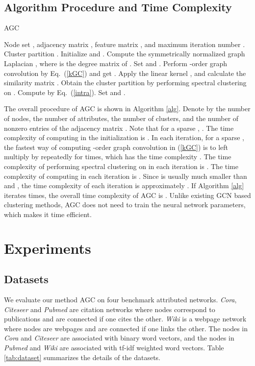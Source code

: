 \documentclass{article}
\begin{document}
\subsection{Algorithm Procedure and Time Complexity}



\begin{algorithm}[t]\footnotesize
\caption{AGC}
\label{alg}
\begin{algorithmic}[1]
\REQUIRE
Node set , adjacency matrix , feature matrix , and maximum iteration number .
\ENSURE
Cluster partition .
\STATE Initialize  and . Compute the symmetrically normalized graph Laplacian , where  is the degree matrix of .
\REPEAT
\STATE Set  and .
\STATE Perform -order graph convolution by Eq.~(\ref{kGC}) and get .
\STATE Apply the linear kernel , and calculate the similarity matrix .
\STATE Obtain the cluster partition  by performing spectral clustering on .
\STATE Compute  by Eq.~(\ref{intra}).
\STATE Set  and .
\end{algorithmic}
\end{algorithm}

The overall procedure of AGC is shown in Algorithm \ref{alg}.
Denote by  the number of nodes,  the number of attributes,  the number of clusters, and  the number of nonzero entries of the adjacency matrix . Note that for a sparse , . The time complexity of computing  in the initialization is . In each iteration, for a sparse , the fastest way of computing -order graph convolution in (\ref{kGC}) is to left multiply  by  repeatedly for  times, which has the time complexity . The time complexity of performing spectral clustering on  in each iteration is . The time complexity of computing  in each iteration is . Since  is usually much smaller than  and , the time complexity of each iteration is approximately  . If Algorithm \ref{alg} iterates  times, the overall time complexity of AGC is . Unlike existing GCN based clustering methods, AGC does not need to train the neural network parameters, which makes it time efficient.


 
\section{Experiments}

\subsection{Datasets}
We evaluate our method AGC on four benchmark attributed networks. \emph{Cora}, \emph{Citeseer} and \emph{Pubmed} \cite{kipf2016variational} are citation networks where nodes correspond to publications and are connected if one cites the other. \emph{Wiki} \cite{yang2015network} is a webpage network where nodes are webpages and are connected if one links the other.
The nodes in \emph{Cora} and \emph{Citeseer} are associated with binary word vectors, and the nodes in \emph{Pubmed} and \emph{Wiki} are associated with tf-idf weighted word vectors. Table \ref{tab:dataset} summarizes the details of the datasets.
\end{document}
